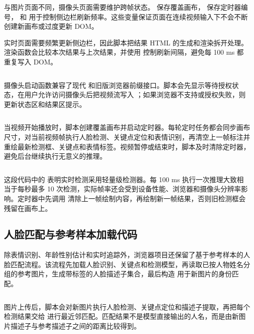 与图片页面不同，摄像头页面需要维护跨帧状态。 保存覆盖画布， 保存定时器编号， 和  用于控制侧边栏刷新频率。这些变量保证页面在连续视频输入下不会不断创建新画布或过度更新 DOM。

实时页面需要频繁更新侧边栏，因此脚本把结果 HTML 的生成和渲染拆开处理。渲染函数会比较本次结果与上次结果，并使用  控制刷新间隔，避免每 100 ms 都重复写入 DOM。

\inputminted[firstline=87,lastline=160,firstnumber=87]{javascript}{code/face-recognition/dist/webcam_script.js}

摄像头启动函数兼容了现代  和旧版浏览器前缀接口。脚本会先显示等待授权状态，在用户允许访问摄像头后把视频流写入 ；如果浏览器不支持或授权失败，则更新状态区和结果区提示。

\inputminted[firstline=162,lastline=216,firstnumber=162]{javascript}{code/face-recognition/dist/webcam_script.js}

当视频开始播放时，脚本创建覆盖画布并启动定时器。每轮定时任务都会同步画布尺寸，对当前视频帧执行人脸检测、关键点定位和表情识别，再清空上一帧标注并重绘最新检测框、关键点和表情标签。视频暂停或结束时，脚本及时清除定时器，避免后台继续执行无意义的推理。

\inputminted[firstline=218,lastline=259,firstnumber=218]{javascript}{code/face-recognition/dist/webcam_script.js}

这段代码中的  表明实时检测采用轻量级检测器。每 100 ms 执行一次推理大致相当于每秒最多 10 次检测，实际帧率还会受到设备性能、浏览器和摄像头分辨率影响。定时器中先调用  清除上一帧绘制内容，再绘制新一帧结果，否则旧检测框会残留在画布上。

\subsection*{人脸匹配与参考样本加载代码}

除表情识别、年龄性别估计和实时追踪外，浏览器项目还保留了基于参考样本的人脸匹配流程。该流程先加载人脸识别、关键点和检测模型，再读取已按人物姓名分组的参考图片，生成带标签的人脸描述子集合，最后构造  用于新图片的身份匹配。

\inputminted[firstline=1,lastline=18,firstnumber=1]{javascript}{code/face-recognition/dist/image_script.js}

图片上传后，脚本会对新图片执行人脸检测、关键点定位和描述子提取，再把每个检测结果交给  进行最近邻匹配。匹配结果不是模型直接输出的人名，而是由新图片描述子与参考描述子之间的距离比较得到。

